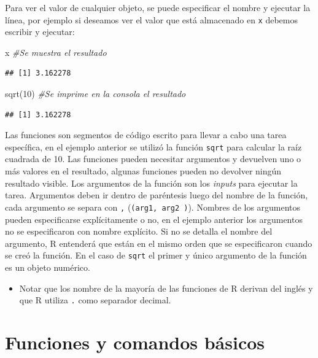 \documentclass[
]{book}
\newenvironment{Shaded}{\begin{snugshade}}{\end{snugshade}}
\newcommand{\CommentTok}[1]{\textcolor[rgb]{0.56,0.35,0.01}{\textit{#1}}}
\newcommand{\DecValTok}[1]{\textcolor[rgb]{0.00,0.00,0.81}{#1}}
\newcommand{\FunctionTok}[1]{\textcolor[rgb]{0.00,0.00,0.00}{#1}}
\newcommand{\NormalTok}[1]{#1}
\newenvironment{rmdblock}[1]
{\begin{shaded*}
		\begin{itemize}
			\renewcommand{\labelitemi}{
				\raisebox{-.7\height}[0pt][0pt]{
					{\setkeys{Gin}{width=3em,keepaspectratio}\texttt{[image: images/\#1]}}
				}
			}
			\item
		}
		{
		\end{itemize}
	\end{shaded*}
}
\newenvironment{rmdnote}
{\begin{rmdblock}{note}}
	{\end{rmdblock}}
\begin{document}
Para ver el valor de cualquier objeto, se puede especificar el nombre y ejecutar la línea, por ejemplo si deseamos ver el valor que está almacenado en \texttt{x} debemos escribir y ejecutar:

\begin{Shaded}
\begin{Highlighting}[]
\NormalTok{x }\CommentTok{\#Se muestra el resultado}
\end{Highlighting}
\end{Shaded}

\begin{verbatim}
## [1] 3.162278
\end{verbatim}

\begin{Shaded}
\begin{Highlighting}[]
\FunctionTok{sqrt}\NormalTok{(}\DecValTok{10}\NormalTok{) }\CommentTok{\#Se imprime en la consola el resultado}
\end{Highlighting}
\end{Shaded}

\begin{verbatim}
## [1] 3.162278
\end{verbatim}

Las funciones son segmentos de código escrito para llevar a cabo una tarea
específica, en el ejemplo anterior se utilizó la función \texttt{sqrt} para calcular
la raíz cuadrada de 10. Las funciones pueden necesitar argumentos y devuelven
uno o más valores en el resultado, algunas funciones pueden no devolver ningún
resultado visible. Los argumentos de la función son los \emph{inputs} para ejecutar
la tarea. Argumentos deben ir dentro de paréntesis luego del nombre de la función,
cada argumento se separa con \texttt{,} (\texttt{(arg1,\ arg2\ )}). Nombres de los argumentos
pueden especificarse explícitamente o no, en el ejemplo anterior los argumentos no
se especificaron con nombre explícito. Si no se detalla el nombre del argumento,
R entenderá que están en el mismo orden que se especificaron cuando se creó la
función. En el caso de \texttt{sqrt} el primer y único argumento de la función es un
objeto numérico.

\begin{rmdnote}
Notar que los nombre de la mayoría de las funciones de R derivan del
inglés y que R utiliza \texttt{.} como separador decimal.
\end{rmdnote}

\hypertarget{funciones-y-comandos-buxe1sicos}{%
\section{Funciones y comandos básicos}\label{funciones-y-comandos-buxe1sicos}}
\end{document}
